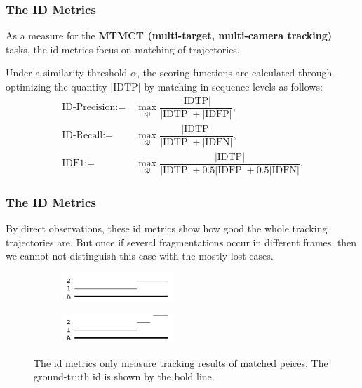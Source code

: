 \documentclass[slidetop, mathserif]{beamer}
\begin{document}
\begin{frame}
	\frametitle{The ID Metrics}
	
	As a measure for the {\bf MTMCT (multi-target, multi-camera tracking)} tasks,
	the id metrics focus on matching of trajectories.
	
	\quad 
	
	Under a similarity threshold $\alpha$, the scoring functions are calculated through optimizing
	the quantity $|\text{IDTP}|$ by matching in sequence-levels as follows:
	\begin{align*}
		\text{ID-Precision} := & ~ \max_{\mathfrak P} \dfrac{|\text{IDTP}|}{|\text{IDTP}| + |\text{IDFP}|}, \\
		\text{ID-Recall} :=    & ~ \max_{\mathfrak P}\dfrac{|\text{IDTP}|}{|\text{IDTP}| + |\text{IDFN}|},  \\
		\text{IDF1} :=         &                                                                            
		~ \max_{\mathfrak P}\dfrac{|\text{IDTP}|}{|\text{IDTP}| + 0.5|\text{IDFP}| + 0.5|\text{IDFN}|}.
	\end{align*}
	
\end{frame}

\begin{frame}
	\frametitle{The ID Metrics}
	
	By direct observations, these id metrics show how good the whole tracking trajectories are.
	But once if several fragmentations occur in different frames,
	then we cannot not distinguish this case with the mostly lost cases.
	
	\begin{figure}
		\begin{subfigure}{.5\textwidth}
			\centering
			\includegraphics[width=120pt]{pics/fig6.png}
		\end{subfigure}%
		\begin{subfigure}{.5\textwidth}
			\centering
			\includegraphics[width=120pt]{pics/fig7.png}
		\end{subfigure}
		\caption{The id metrics only measure tracking results of matched peices.
		The ground-truth id is shown by the bold line.}
	\end{figure}
	
\end{frame}
\end{document}
